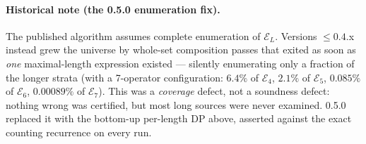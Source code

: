 \documentclass[10pt]{article}
\newcommand{\E}{\mathcal{E}}
\begin{document}
\paragraph{Historical note (the 0.5.0 enumeration fix).} The published algorithm assumes
complete enumeration of $\E_L$. Versions $\le 0.4$.x instead grew the universe by
whole-set composition passes that exited as soon as \emph{one} maximal-length expression
existed --- silently enumerating only a fraction of the longer strata (with a 7-operator
configuration: $6.4\%$ of $\E_4$, $2.1\%$ of $\E_5$, $0.085\%$ of $\E_6$,
$0.00089\%$ of $\E_7$). This was a \emph{coverage} defect, not a soundness defect: nothing
wrong was certified, but most long sources were never examined. 0.5.0 replaced it with
the bottom-up per-length DP above, asserted against the exact counting recurrence on
every run.
\end{document}

